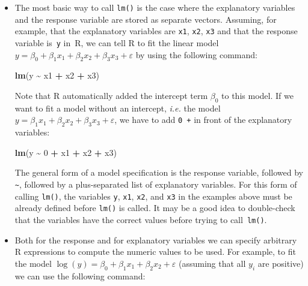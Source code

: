 \documentclass[
  a4paper,
]{article}
\newenvironment{Shaded}{\begin{snugshade}}{\end{snugshade}}
\newcommand{\DecValTok}[1]{\textcolor[rgb]{0.00,0.00,0.81}{#1}}
\newcommand{\FunctionTok}[1]{\textcolor[rgb]{0.13,0.29,0.53}{\textbf{#1}}}
\newcommand{\NormalTok}[1]{#1}
\newcommand{\SpecialCharTok}[1]{\textcolor[rgb]{0.81,0.36,0.00}{\textbf{#1}}}
\theoremstyle{definition}
\theoremstyle{definition}
\theoremstyle{definition}
\theoremstyle{definition}
\theoremstyle{remark}
\begin{document}
\begin{itemize}
\item
  The most basic way to call \texttt{lm()} is the case where the explanatory
  variables and the response variable are stored as separate vectors.
  Assuming, for example, that the explanatory variables are \texttt{x1}, \texttt{x2}, \texttt{x3}
  and that the response variable is~\texttt{y} in~R, we can tell R to fit the
  linear model \(y = \beta_0 + \beta_1 x_1 + \beta_2 x_2 + \beta_3 x_3 + \varepsilon\)
  by using the following command:

\begin{Shaded}
\begin{Highlighting}[]
  \FunctionTok{lm}\NormalTok{(y }\SpecialCharTok{\textasciitilde{}}\NormalTok{ x1 }\SpecialCharTok{+}\NormalTok{ x2 }\SpecialCharTok{+}\NormalTok{ x3)}
\end{Highlighting}
\end{Shaded}

  Note that R automatically added the intercept term \(\beta_0\) to this
  model. If we want to fit a model without an intercept,
  \emph{i.e.} the model
  \(y = \beta_1 x_1 + \beta_2 x_2 + \beta_3 x_3 + \varepsilon\), we have to add
  \texttt{0\ +} in front of the explanatory variables:

\begin{Shaded}
\begin{Highlighting}[]
    \FunctionTok{lm}\NormalTok{(y }\SpecialCharTok{\textasciitilde{}} \DecValTok{0} \SpecialCharTok{+}\NormalTok{ x1 }\SpecialCharTok{+}\NormalTok{ x2 }\SpecialCharTok{+}\NormalTok{ x3)}
\end{Highlighting}
\end{Shaded}

  The general form of a model specification is the response variable,
  followed by \texttt{\textasciitilde{}}, followed by a plus-separated list of explanatory
  variables. For this form of calling \texttt{lm()}, the variables \texttt{y},
  \texttt{x1}, \texttt{x2}, and \texttt{x3} in the examples above must be already defined before
  \texttt{lm()} is called. It may be a good idea to double-check that the variables
  have the correct values before trying to call~\texttt{lm()}.
\item
  Both for the response and for explanatory variables we can
  specify arbitrary R expressions to compute the numeric values to be
  used. For example, to fit the model
  \(\log(y) = \beta_0 + \beta_1 x_1 + \beta_2 x_2 + \varepsilon\) (assuming
  that all \(y_i\) are positive) we can use the following command:


\end{itemize}
\end{document}
